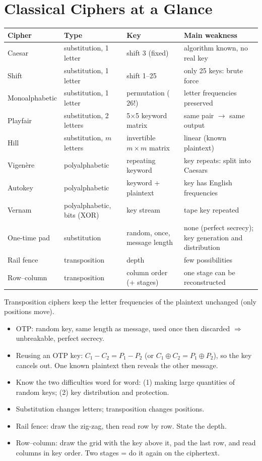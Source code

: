 \section{Classical Ciphers at a Glance}
\begin{center}\small
\begin{tabularx}{\textwidth}{@{}l l l X@{}}
\toprule
Cipher & Type & Key & Main weakness\\
\midrule
Caesar & substitution, 1 letter & shift 3 (fixed) & algorithm known, no real key\\
Shift & substitution, 1 letter & shift 1--25 & only 25 keys: brute force\\
Monoalphabetic & substitution, 1 letter & permutation ($26!$) & letter frequencies preserved\\
Playfair & substitution, 2 letters & 5$\times$5 keyword matrix & same pair $\to$ same output\\
Hill & substitution, $m$ letters & invertible $m\times m$ matrix & linear (known plaintext)\\
Vigen\`ere & polyalphabetic & repeating keyword & key repeats: split into Caesars\\
Autokey & polyalphabetic & keyword + plaintext & key has English frequencies\\
Vernam & polyalphabetic, bits (XOR) & key stream & tape key repeated\\
One-time pad & substitution & random, once, message length & none (perfect secrecy); key generation and distribution\\
Rail fence & transposition & depth & few possibilities\\
Row--column & transposition & column order (+ stages) & one stage can be reconstructed\\
\bottomrule
\end{tabularx}
\end{center}
Transposition ciphers keep the letter frequencies of the plaintext unchanged (only positions move).

\begin{examtip}
\begin{itemize}
  \item OTP: random key, same length as message, used once then discarded $\Rightarrow$ unbreakable, perfect secrecy.
  \item Reusing an OTP key: $C_1 - C_2 = P_1 - P_2$ (or $C_1\oplus C_2 = P_1\oplus P_2$), so the key cancels out. One known plaintext then reveals the other message.
  \item Know the two difficulties word for word: (1) making large quantities of random keys; (2) key distribution and protection.
  \item Substitution changes letters; transposition changes positions.
  \item Rail fence: draw the zig-zag, then read row by row. State the depth.
  \item Row--column: draw the grid with the key above it, pad the last row, and read columns in key order. Two stages = do it again on the ciphertext.
\end{itemize}
\end{examtip}

